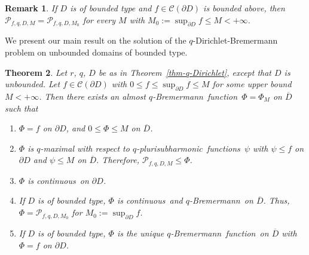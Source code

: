 \documentclass[10pt,a4paper]{amsart}
\newtheorem{thm}{Theorem}[section]
\newtheorem{rem}[thm]{Remark}
\numberwithin{equation}{section}
\newcommand{\ccal}{\mathcal{C}}
\newcommand{\pcal}{\mathcal{P}}
\newcommand{\qbrem}{$q$-Bremermann}
\newcommand{\qpsh}{$q$-pluri\-sub\-harmonic}
\newcommand{\cont}{continuous}
\newcommand{\fct}{function}
\newcommand{\fcts}{functions}
\newcommand{\cld}{\overline{D}}
\begin{document}
\begin{rem}\label{rem-qpsh-max-princ-2} If $D$ is of bounded type and $f \in\ccal(\partial D)$ is bounded above, then $\pcal_{f,q,D,M} =\pcal_{f,q,D,M_0}$ for every $M$ with $M_0:=\sup_{\partial D} f \leq M < +\infty$.
\end{rem}

We present our main result on the solution of the $q$-Dirichlet-Bremermann problem on unbounded domains of bounded type.


\begin{thm}\label{thm-q-Dirichlet-unbounded}
Let $r$, $q$, $D$ be as in Theorem~\ref{thm-q-Dirichlet}, except that $D$ is unbounded. Let $f \in \ccal(\partial D)$ with $0 \leq f \leq \sup_{\partial D} f \leq M$ for some upper bound $M < +\infty$. Then there exists an almost \qbrem\ \fct\ $\Phi=\Phi_M$ on $\cld$ such that

\begin{enumerate}

\item $\Phi=f$ on $\partial D$, and $0 \leq \Phi \leq M$ on $\cld$.

\item $\Phi$ is $q$-maximal with respect to \qpsh\ \fcts\ $\psi$ with $\psi \leq f$ on $\partial D$ and $\psi \leq M$ on $\cld$. Therefore, $\pcal_{f,q,D,M} \leq \Phi$.

\item $\Phi$ is \cont\ on $\partial D$.

\item If $D$ is of bounded type, $\Phi$ is \cont\ and \qbrem\ on $\cld$. Thus, $\Phi=\pcal_{f,q,D,M_0}$ for $M_0:=\sup_{\partial D} f$.

\item If $D$ is of bounded type, $\Phi$ is the unique \qbrem\ \fct\ on $\cld$ with $\Phi=f$ on $\partial D$.%

\end{enumerate}

\end{thm}
\end{document}
